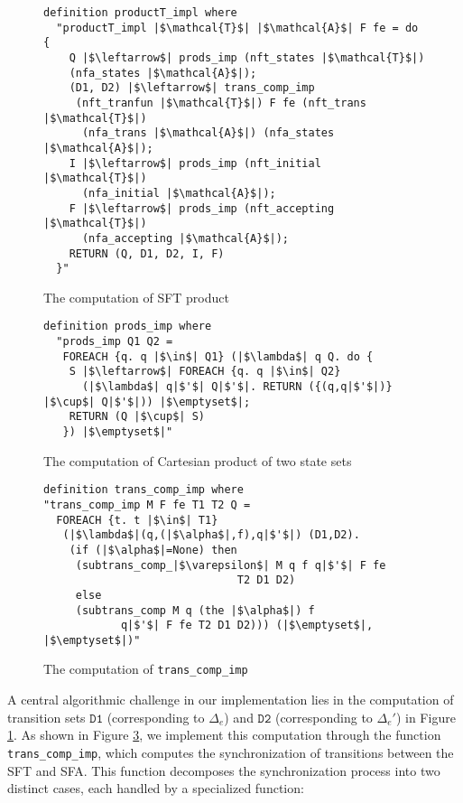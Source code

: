 \documentclass[sigplan,10pt,anonymous,review]{acmart}\settopmatter{printfolios=true,printccs=false,printacmref=false}
\begin{document}
\begin{figure}[hbt!]
	\begin{lstlisting}
definition productT_impl where
  "productT_impl |$\mathcal{T}$| |$\mathcal{A}$| F fe = do {
    Q |$\leftarrow$| prods_imp (nft_states |$\mathcal{T}$|) 
    (nfa_states |$\mathcal{A}$|);
    (D1, D2) |$\leftarrow$| trans_comp_imp 
     (nft_tranfun |$\mathcal{T}$|) F fe (nft_trans |$\mathcal{T}$|) 
      (nfa_trans |$\mathcal{A}$|) (nfa_states |$\mathcal{A}$|);
    I |$\leftarrow$| prods_imp (nft_initial |$\mathcal{T}$|)
      (nfa_initial |$\mathcal{A}$|);
    F |$\leftarrow$| prods_imp (nft_accepting |$\mathcal{T}$|) 
      (nfa_accepting |$\mathcal{A}$|);
    RETURN (Q, D1, D2, I, F)
  }"
\end{lstlisting}
\caption{The computation of SFT product}
\label{fig-compute-nft-product}
\end{figure}



\begin{figure}[hbt!]
	\begin{lstlisting}
definition prods_imp where
  "prods_imp Q1 Q2 =
   FOREACH {q. q |$\in$| Q1} (|$\lambda$| q Q. do {
    S |$\leftarrow$| FOREACH {q. q |$\in$| Q2}
      (|$\lambda$| q|$'$| Q|$'$|. RETURN ({(q,q|$'$|)} |$\cup$| Q|$'$|)) |$\emptyset$|;
    RETURN (Q |$\cup$| S)
   }) |$\emptyset$|"
\end{lstlisting}
\caption{The computation of Cartesian product of two state sets}
\label{fig-def-prods_imp}
\end{figure}



\begin{figure}[hbt!]
	\begin{lstlisting}
definition trans_comp_imp where
"trans_comp_imp M F fe T1 T2 Q =
  FOREACH {t. t |$\in$| T1}
   (|$\lambda$|(q,(|$\alpha$|,f),q|$'$|) (D1,D2). 
    (if (|$\alpha$|=None) then 
     (subtrans_comp_|$\varepsilon$| M q f q|$'$| F fe 
                              T2 D1 D2)
     else
     (subtrans_comp M q (the |$\alpha$|) f 
            q|$'$| F fe T2 D1 D2))) (|$\emptyset$|, |$\emptyset$|)"
\end{lstlisting}
\caption{The computation of \texttt{trans\_comp\_imp}}
\label{fig-def-prods-imp}
\end{figure}

A central algorithmic challenge in our implementation lies in the computation of transition sets $\texttt{D1}$ (corresponding to $\Delta_e$) and $\texttt{D2}$ (corresponding to $\Delta_e'$) in Figure \ref{fig-compute-nft-product}. As shown in Figure \ref{fig-def-prods-imp}, we implement this computation through the function \texttt{trans\_comp\_imp}, which computes the synchronization of transitions between the SFT and SFA. This function decomposes the synchronization process into two distinct cases, each handled by a specialized function:
\end{document}
